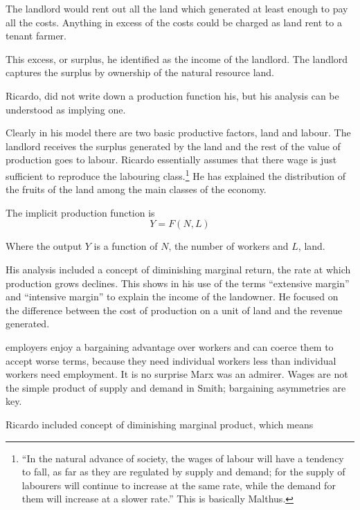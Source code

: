 The landlord would rent out all the land which generated at least enough to pay all the costs. Anything in excess of the costs could be charged as land rent to a tenant farmer.

This excess, or surplus, he identified as the income of the landlord. The landlord captures the surplus by ownership of the natural resource land. 

Ricardo, did not write down a production function his, but his analysis can be understood as implying one.

Clearly in his model there are two basic productive factors, land and labour. The landlord  receives the surplus generated by the land and the rest of the value of production goes to labour. Ricardo essentially assumes that there wage is  just sufficient to reproduce the labouring class.\footnote{``In the natural advance of society, the wages of labour will have a tendency to fall, as far as they are regulated by supply and demand; for the supply of labourers will continue to increase at the same rate, while the demand for them will increase at a slower rate.''  This is  basically Malthus.} He has explained the distribution of the fruits of the land among the main classes of the economy.

The implicit production function is
\[Y=F(N, L)\]

Where the output $Y$ is a function of $N$, the number of workers and $L$, land.

His analysis included a concept of diminishing marginal return, the rate at which production grows declines. 
This shows in his use of the terms ``extensive margin'' and ``intensive margin'' to explain the income of the landowner. He focused on the difference between the cost of production on a unit of land and the revenue generated. 



employers enjoy a bargaining advantage over workers and can coerce them to accept worse terms, because they need individual workers less than individual workers need employment. It is no surprise Marx was an admirer. Wages are not the simple product of supply and demand in Smith; bargaining asymmetries are key.

Ricardo included concept of diminishing marginal product, which means


